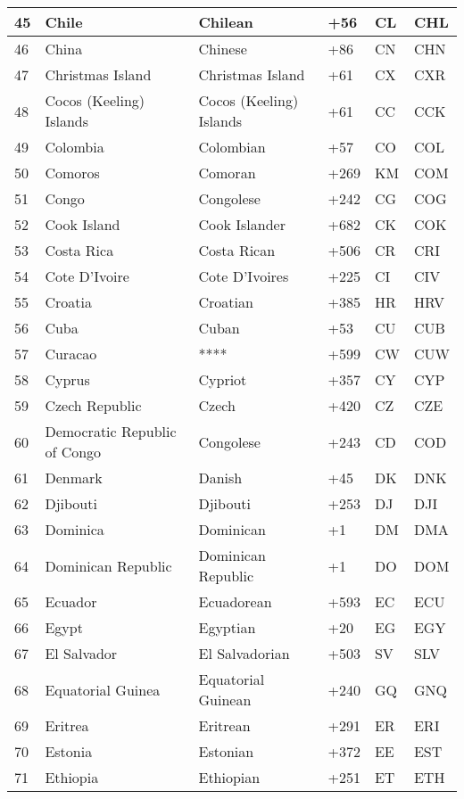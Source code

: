 \begin{longtable}{|l|l|l|l|l|l|}
45 & Chile & Chilean & +56 & CL & CHL \\ \hline 
46 & China & Chinese & +86 & CN & CHN \\ \hline 
47 & Christmas Island & Christmas Island & +61 & CX & CXR \\ \hline 
48 & Cocos (Keeling) Islands & Cocos (Keeling) Islands & +61 & CC & CCK \\ \hline 
49 & Colombia & Colombian & +57 & CO & COL \\ \hline 
50 & Comoros & Comoran & +269 & KM & COM \\ \hline 
51 & Congo & Congolese & +242 & CG & COG \\ \hline 
52 & Cook Island & Cook Islander & +682 & CK & COK \\ \hline 
53 & Costa Rica & Costa Rican & +506 & CR & CRI \\ \hline 
54 & Cote D'Ivoire & Cote D'Ivoires & +225 & CI & CIV \\ \hline 
55 & Croatia & Croatian & +385 & HR & HRV \\ \hline 
56 & Cuba & Cuban & +53 & CU & CUB \\ \hline 
57 & Curacao & **** & +599 & CW & CUW \\ \hline 
58 & Cyprus & Cypriot & +357 & CY & CYP \\ \hline 
59 & Czech Republic & Czech & +420 & CZ & CZE \\ \hline 
60 & Democratic Republic of Congo & Congolese & +243 & CD & COD \\ \hline 
61 & Denmark & Danish & +45 & DK & DNK \\ \hline 
62 & Djibouti & Djibouti & +253 & DJ & DJI \\ \hline 
63 & Dominica & Dominican & +1 & DM & DMA \\ \hline 
64 & Dominican Republic & Dominican Republic & +1 & DO & DOM \\ \hline 
65 & Ecuador & Ecuadorean & +593 & EC & ECU \\ \hline 
66 & Egypt & Egyptian & +20 & EG & EGY \\ \hline 
67 & El Salvador & El Salvadorian & +503 & SV & SLV \\ \hline 
68 & Equatorial Guinea & Equatorial Guinean & +240 & GQ & GNQ \\ \hline 
69 & Eritrea & Eritrean & +291 & ER & ERI \\ \hline 
70 & Estonia & Estonian & +372 & EE & EST \\ \hline 
71 & Ethiopia & Ethiopian & +251 & ET & ETH \\ \hline 

\end{longtable}

